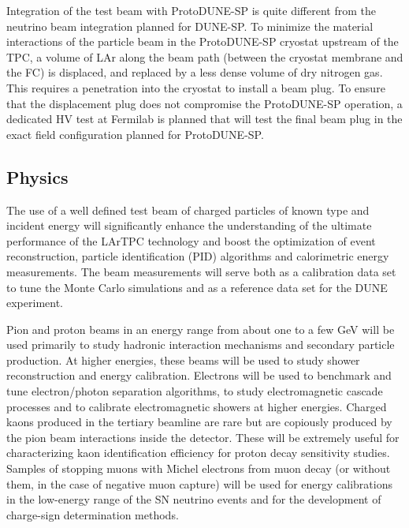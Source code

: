 Integration of the test beam with ProtoDUNE-SP is quite different from the neutrino beam integration planned for DUNE-SP. To minimize the material interactions of the particle beam in the ProtoDUNE-SP cryostat upstream of the TPC, a volume of LAr along the beam path (between the cryostat membrane and the FC) is displaced, and replaced by a less dense volume of dry nitrogen gas. This requires a penetration into the cryostat to install a  beam plug. To ensure that the displacement plug does not compromise the ProtoDUNE-SP operation, a dedicated HV test at Fermilab is planned that will test the final beam plug in the exact field configuration planned for ProtoDUNE-SP.

\subsection{Physics}


The use of a well defined test beam of charged particles of known type and incident  energy will significantly enhance the understanding of the ultimate performance of the LArTPC technology and boost the optimization of event reconstruction, particle identification (PID) algorithms and calorimetric energy measurements.  The beam measurements will serve both as a calibration data set to tune the Monte Carlo simulations and as a reference data set for the DUNE experiment. 

Pion and proton beams in an energy range from about one to a few GeV will be used primarily to study hadronic interaction mechanisms and secondary particle production.  At higher energies, these beams will be used to study shower reconstruction and energy calibration. Electrons will be used to benchmark and tune electron/photon separation algorithms, to study electromagnetic cascade processes and to calibrate electromagnetic showers at higher energies. Charged kaons produced in the tertiary beamline are rare but are copiously produced by the pion beam interactions inside the detector. These will be extremely useful for characterizing kaon identification efficiency for proton decay sensitivity studies.  Samples of stopping muons with Michel electrons from muon decay (or without them, in the case of negative muon capture) will be used for energy calibrations in the low-energy range of the SN neutrino events and for the development of charge-sign determination methods. 

